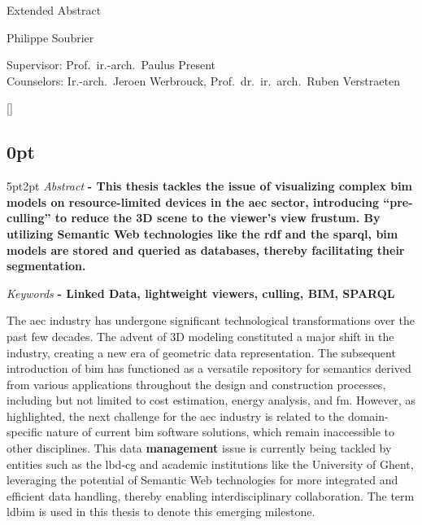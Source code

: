 \begin{center}
    \sffamily
    \huge Extended Abstract

    \Large Philippe Soubrier

    \normalsize
    Supervisor: Prof.\ ir.-arch.\ Paulus Present\\
    Counselors: Ir.-arch.\ Jeroen Werbrouck, Prof.\ dr.\ ir.\ arch.\ Ruben Verstraeten
\end{center}
\begin{refsection}
    []{}
    \begin{multicols}{2}
        \small
        \titlespacing\subsection{0pt}{5pt}{2pt}
        \emph{Abstract} \textbf{
            - This thesis tackles the issue of visualizing complex \ac{bim} models on resource-limited devices in the \ac{aec} sector, introducing \enquote{pre-culling} to reduce the 3D scene to the viewer's view frustum. By utilizing Semantic Web technologies like the \ac{rdf} and the \ac{sparql}, \ac{bim} models are stored and queried as databases, thereby facilitating their segmentation.
        }

        \emph{Keywords} \textbf{
            - Linked Data, lightweight viewers, culling, BIM, SPARQL
        }

        The \ac{aec} industry has undergone significant technological transformations over the past few decades. The advent of 3D modeling constituted a major shift in the industry, creating a new era of geometric data representation. The subsequent introduction of \ac{bim} has functioned as a versatile repository for semantics derived from various applications throughout the design and construction processes, including but not limited to cost estimation, energy analysis, and \ac{fm}. However, as \cite{Werbrouck2018} highlighted, the next challenge for the \ac{aec} industry is related to the domain-specific nature of current \ac{bim} software solutions, which remain inaccessible to other disciplines. This data \textbf{management} issue is currently being tackled by entities such as the \ac{lbd-cg} and academic institutions like the University of Ghent, leveraging the potential of Semantic Web technologies for more integrated and efficient data handling, thereby enabling interdisciplinary collaboration. The term \ac{ldbim} is used in this thesis to denote this emerging milestone.


\end{multicols}
\end{refsection}
